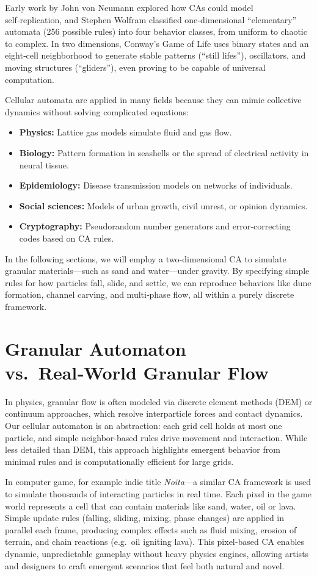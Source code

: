\documentclass{article}
\begin{document}
Early work by John von Neumann explored how CAs could model self‑replication, and Stephen Wolfram classified one‑dimensional “elementary” automata (256 possible rules) into four behavior classes, from uniform to chaotic to complex. In two dimensions, Conway’s Game of Life uses binary states and an eight‑cell neighborhood to generate stable patterns (“still lifes”), oscillators, and moving structures (“gliders”), even proving to be capable of universal computation.

Cellular automata are applied in many fields because they can mimic collective dynamics without solving complicated equations:
\begin{itemize}
  \item \textbf{Physics:} Lattice gas models simulate fluid and gas flow.
  \item \textbf{Biology:} Pattern formation in seashells or the spread of electrical activity in neural tissue.
  \item \textbf{Epidemiology:} Disease transmission models on networks of individuals.
  \item \textbf{Social sciences:} Models of urban growth, civil unrest, or opinion dynamics.
  \item \textbf{Cryptography:} Pseudorandom number generators and error‑correcting codes based on CA rules.
\end{itemize}

In the following sections, we will employ a two‑dimensional CA to simulate granular materials—such as sand and water—under gravity. By specifying simple rules for how particles fall, slide, and settle, we can reproduce behaviors like dune formation, channel carving, and multi‑phase flow, all within a purely discrete framework.


\section{Granular Automaton vs.\ Real‑World Granular Flow}

In physics, granular flow is often modeled via discrete element methods (DEM) or continuum approaches, which resolve interparticle forces and contact dynamics. Our cellular automaton is an abstraction: each grid cell holds at most one particle, and simple neighbor‑based rules drive movement and interaction. While less detailed than DEM, this approach highlights emergent behavior from minimal rules and is computationally efficient for large grids.

In computer game, for example indie title \textit{Noita}—a similar CA framework is used to simulate thousands of interacting particles in real time. Each pixel in the game world represents a cell that can contain materials like sand, water, oil or lava. Simple update rules (falling, sliding, mixing, phase changes) are applied in parallel each frame, producing complex effects such as fluid mixing, erosion of terrain, and chain reactions (e.g.\ oil igniting lava). This pixel‑based CA enables dynamic, unpredictable gameplay without heavy physics engines, allowing artists and designers to craft emergent scenarios that feel both natural and novel.
\end{document}
